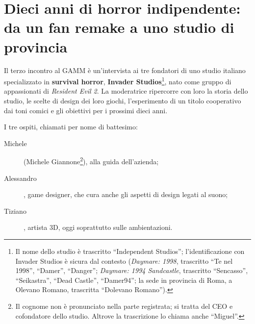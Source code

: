 
\chapter[Dieci anni di horror indipendente]{Dieci anni di horror
indipendente: da un fan remake a uno studio di provincia}
\label{cap:c1-3-horror-indipendente}

Il terzo incontro al GAMM è un'intervista ai tre fondatori di uno studio
italiano specializzato in \textbf{survival horror}, \textbf{Invader
Studios}\footnote{Il nome dello studio è trascritto ``Independent Studios'';
l'identificazione con Invader Studios è sicura dal contesto (\emph{Daymare:
1998}, trascritto ``Te nel 1998'', ``Damer'', ``Danger''; \emph{Daymare: 1994
Sandcastle}, trascritto ``Sencasso'', ``Seikastra'', ``Dead Castle'',
``Damer94''; la sede in provincia di Roma, a Olevano Romano, trascritta
``Dolevano Romano'').}, nato come gruppo di appassionati di \emph{Resident
Evil 2}. La moderatrice ripercorre con loro la storia dello studio, le scelte di
design dei loro giochi, l'esperimento di un titolo cooperativo dai toni comici e
gli obiettivi per i prossimi dieci anni.

I tre ospiti, chiamati per nome di battesimo:
\begin{description}
  \item[Michele] (Michele Giannone\footnote{Il cognome non è pronunciato nella
        parte registrata; si tratta del CEO e cofondatore dello studio. Altrove
        la trascrizione lo chiama anche ``Miguel''.}), alla guida
        dell'azienda;
  \item[Alessandro], game designer, che cura anche gli aspetti di design legati
        al suono;
  \item[Tiziano], artista 3D, oggi soprattutto sulle ambientazioni.
\end{description}

